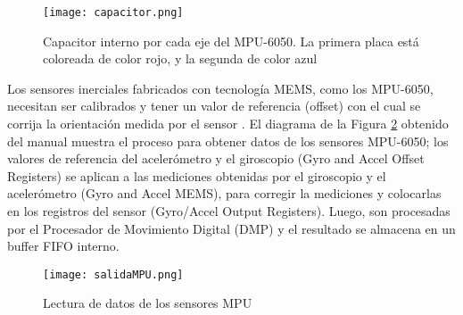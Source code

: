 \begin{figure}[htb]
	\centering
	\texttt{[image: capacitor.png]}
	\caption{Capacitor interno por cada eje del MPU-6050. La primera placa está coloreada de color rojo, y la segunda de color azul}
	\label{fig:salidaMPU}
\end{figure}

Los sensores inerciales fabricados con tecnología MEMS, como los MPU-6050, necesitan ser calibrados y tener un valor de referencia (offset) con el cual se corrija la orientación medida por el sensor \cite{offsetMPU}. El diagrama de la Figura \ref{fig:salidaMPU} obtenido del manual \cite{offsetMPU} muestra el proceso para obtener datos de los sensores MPU-6050; los valores de referencia del acelerómetro y el giroscopio (Gyro and Accel Offset Registers) se aplican a las mediciones obtenidas por el giroscopio y el acelerómetro (Gyro and Accel MEMS), para corregir la mediciones y colocarlas en los registros del sensor (Gyro/Accel Output Registers). Luego, son procesadas por el Procesador de Movimiento Digital (DMP) y el resultado se almacena en un buffer FIFO interno.

\begin{figure}[htb]
	\centering
	\texttt{[image: salidaMPU.png]}
	\caption{Lectura de datos de los sensores MPU}
	\label{fig:salidaMPU}
\end{figure}



